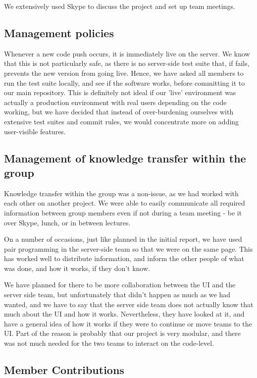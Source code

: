 \documentclass[a4paper,12pt]{article}
\begin{document}
			We extensively used Skype to discuss the project and set up team meetings.
		
		\subsection{Management policies}
		
		Whenever a new code push occurs, it is immediately live on the server. We know that this is not particularly safe, as there is no server-side test suite that, if fails, prevents the new version from going live. Hence, we have asked all members to run the test suite locally, and see if the software works, before committing it to our main repository. This is definitely not ideal if our 'live' environment was actually a production environment with real users depending on the code working, but we have decided that instead of over-burdening ourselves with extensive test suites and commit rules, we would concentrate more on adding user-visible features.
		
		\subsection{Management of knowledge transfer within the group}
		
		Knowledge transfer within the group was a non-issue, as we had worked with each other on another project. We were able to easily communicate all required information between group members even if not during a team meeting - be it over Skype, lunch, or in between lectures.
		
		On a number of occasions, just like planned in the initial report, we have used pair programming in the server-side team so that we were on the same page. This has worked well to distribute information, and inform the other people of what was done, and how it works, if they don't know. 
		
		We have planned for there to be more collaboration between the UI and the server side team, but unfortunately that didn't happen as much as we had wanted, and we have to say that the server side team does not actually know that much about the UI and how it works. Nevertheless, they have looked at it, and have a general idea of how it works if they were to continue or move teams to the UI. Part of the reason is probably that our project is very modular, and there was not much needed for the two teams to interact on the code-level.
	
	\subsection{Member Contributions}
\end{document}
